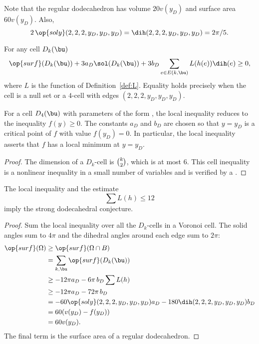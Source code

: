 Note that the regular dodecahedron has volume $20 v(y_D)$ and surface
area $60 v(y_D)$.  Also,
\begin{equation}
  2\,\op{soly}(2,2,2,y_D,y_D,y_D) =\dih(2,2,2,y_D,y_D,y_D)=2\pi/5.
\end{equation}
%
%

\begin{lemma}\label{lemma:D-local}
For any cell $D_k(\bu)$
\[
  \op{surf}(D_k(\bu)) + 3 a_D \sol(D_k(\bu)) 
+ 3 b_D \sum_{e\in E(k,\bu)} L(h(e)) \dih(e) \ge 0,
\]
where $L$ is the function of Definition~\ref{def:L}.  Equality holds
precisely when the cell is a null set or a $4$-cell with edges
$(2,2,2,y_D,y_D,y_D)$.
\end{lemma}
%



For a cell $D_4(\bu)$ with parameters of the form
  , the local inequality reduces to the inequality
  $f(y)\ge 0$.  The constants $a_D$ and $b_D$ are chosen so that
  $y=y_D$ is a critical point of $f$ with value $f(y_D)=0$.  In
  particular, the local inequality asserts that $f$ has a local
  minimum at $y=y_D$.


\begin{proof} 
  The dimension of a $D_k$-cell is $\tbinom{k}{2}$, which is at most $6$.  
This cell inequality is a nonlinear inequality in a small number of variables
and is verified by a 
.  
\end{proof}

\begin{lemma}[]
  The local inequality and the estimate 
\[
\sum L(h) \le 12
\]
imply the strong dodecahedral conjecture.
\end{lemma}

\begin{proof} 
  Sum the local inequality over all the $D_k$-cells in a Voronoi cell.
  The solid angles sum to $4\pi$ and the dihedral angles around each
  edge sum to $2\pi$:
\begin{align*}
  \op{surf}(\Omega) &\ge \op{surf}(\Omega\cap B)\\
  &=\sum_{k,\bu} \op{surf}(D_k(\bu))\\
  &\ge -12\pi a_D - 6\pi\, b_D  \sum L(h)\\
  &\ge -12\pi a_D - 72\pi\, b_D\\
  &= -60 \op{soly}(2,2,2,y_D,y_D,y_D) a_D - 180 \dih(2,2,2,y_D,y_D,y_D) b_D\\
  &= 60 (v(y_D) - f(y_D))\\
  &= 60 v(y_D).\\
\end{align*}
The final term is the surface area of a regular dodecahedron.
\end{proof}

